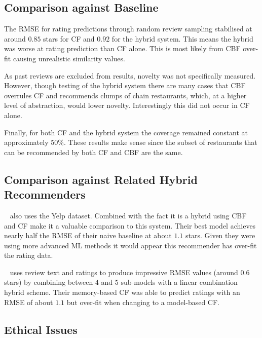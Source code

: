 \subsection{Comparison against Baseline}\label{subsec:baseline-comparison}
The RMSE for rating predictions through random review sampling stabilised at around $0.85$ stars for CF and $0.92$ for the hybrid system.
This means the hybrid was worse at rating prediction than CF alone.
This is most likely from CBF over-fit causing unrealistic similarity values.

As past reviews are excluded from results, novelty was not specifically measured.
However, though testing of the hybrid system there are many cases that CBF overrules CF and recommends clumps of chain restaurants, which, at a higher level of abstraction, would lower novelty.
Interestingly this did not occur in CF alone.

Finally, for both CF and the hybrid system the coverage remained constant at approximately $50\%$.
These results make sense since the subset of restaurants that can be recommended by both CF and CBF are the same.

\subsection{Comparison against Related Hybrid Recommenders}\label{subsec:related-study-comparison}

~\cite{sawant2013yelp} also uses the Yelp dataset.
Combined with the fact it is a hybrid using CBF and CF make it a valuable comparison to this system.
Their best model achieves nearly half the RMSE of their naive baseline at about $1.1$ stars.
Given they were using more advanced ML methods it would appear this recommender has over-fit the rating data.

~\cite{yulelee2016} uses review text and ratings to produce impressive RMSE values (around 0.6 stars) by combining between 4 and 5 sub-models with a linear combination hybrid scheme.
Their memory-based CF was able to predict ratings with an RMSE of about $1.1$ but over-fit when changing to a model-based CF\@.

\subsection{Ethical Issues}\label{subsec:ethical-issues}

